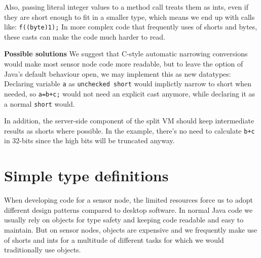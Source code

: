 Also, passing literal integer values to a method call treats them as ints, even if they are short enough to fit in a smaller type, which means we end up with calls like: \texttt{f((byte)1);}
In more complex code that frequently uses of shorts and bytes, these casts can make the code much harder to read.




\textbf{Possible solutions}
We suggest that C-style automatic narrowing conversions would make most sensor node code more readable, but to leave the option of Java's default behaviour open, we may implement this as new datatypes: Declaring variable \texttt{a} as \texttt{unchecked short} would implictly narrow to short when needed, so \texttt{a=b+c;} would not need an explicit cast anymore, while declaring it as a normal \texttt{short} would.

In addition, the server-side component of the split VM should keep intermediate results as shorts where possible. In the example, there's no need to calculate \texttt{b+c} in 32-bits since the high bits will be truncated anyway.





\section{Simple type definitions}
\label{sec-typedef}
When developing code for a sensor node, the limited resources force us to adopt different design patterns compared to desktop software. In normal Java code we usually rely on objects for type safety and keeping code readable and easy to maintain. But on sensor nodes, objects are expensive and we frequently make use of shorts and ints for a multitude of different tasks for which we would traditionally use objects.

